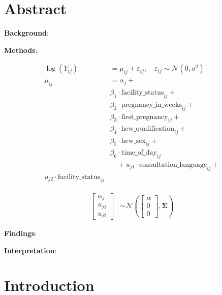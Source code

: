 \documentclass{article}
\date{}
\begin{document}
\vspace*{0.2in}


\title{}
\maketitle
\section*{Abstract}
\textbf{Background}: 

\textbf{Methods}:

\begin{align*}
  \log(Y_{ij}) &= \mu_{ij} + \varepsilon_{ij}, \quad \varepsilon_{ij} \sim \mathcal{N}(0, \sigma^2) \\
  \mu_{ij} &= \alpha_j + \\
  & \beta_1 \cdot \text{facility\_status}_{ij} + \\
  & \beta_2 \cdot \text{pregnancy\_in\_weeks}_{ij} + \\
  & \beta_3 \cdot \text{first\_pregnancy}_{ij} + \\
  & \beta_4 \cdot \text{hcw\_qualification}_{ij} + \\
  & \beta_5 \cdot \text{hcw\_sex}_{ij} + \\ 
  & \beta_6 \cdot \text{time\_of\_day}_{ij} \\
  &\quad + u_{j1} \cdot \text{consultation\_language}_{ij} + \\
  u_{j2} \cdot \text{facility\_status}_{ij}
\end{align*}



\begin{align*}
  \begin{bmatrix}
    \alpha_j \\
    u_{j1} \\
    u_{j2}
  \end{bmatrix}
  &\sim \mathcal{N}
  \left(
  \begin{bmatrix}
    \alpha \\
    0 \\
    0
  \end{bmatrix},
  \boldsymbol{\Sigma}
  \right)
\end{align*}

\textbf{Findings}: 

\textbf{Interpretation}: 

\section*{Introduction}
\end{document}
